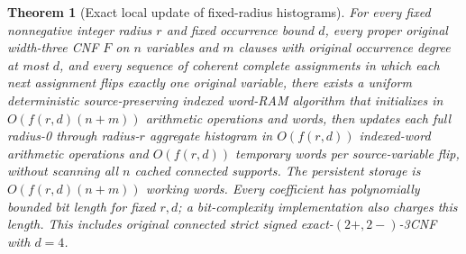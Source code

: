 \documentclass[11pt]{article}
\newtheorem{theorem}{Theorem}
\begin{document}
\begin{theorem}[Exact local update of fixed-radius histograms]\label{thm:dynamic}
For every fixed nonnegative integer radius $r$ and fixed occurrence bound $d$, every proper original width-three CNF $F$ on $n$ variables and $m$ clauses with original occurrence degree at most $d$, and every sequence of coherent complete assignments in which each next assignment flips exactly one original variable, there exists a uniform deterministic source-preserving indexed word-RAM algorithm that initializes in $O(f(r,d)(n+m))$ arithmetic operations and words, then updates \emph{each full radius-0 through radius-$r$ aggregate histogram} in $O(f(r,d))$ indexed-word arithmetic operations and $O(f(r,d))$ temporary words per source-variable flip, without scanning all $n$ cached connected supports. The persistent storage is $O(f(r,d)(n+m))$ working words. Every coefficient has polynomially bounded bit length for fixed $r,d$; a bit-complexity implementation also charges this length. This includes original connected strict signed exact-$(2+,2-)$-3CNF with $d=4$.
\end{theorem}
\end{document}
